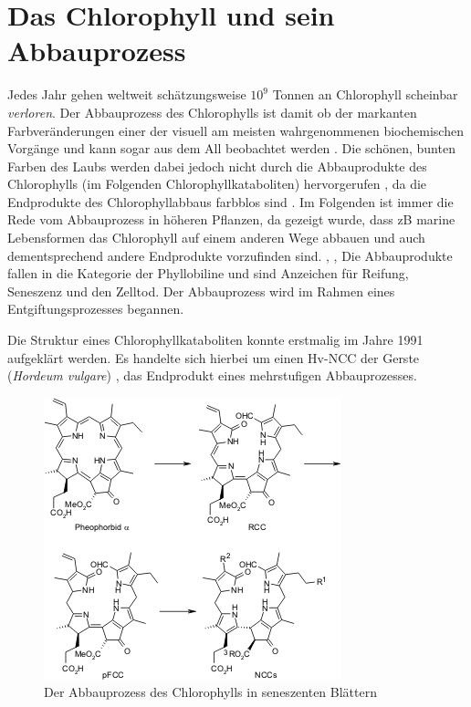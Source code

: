 \chapter{Das Chlorophyll und sein Abbauprozess}

Jedes Jahr gehen weltweit schätzungsweise $10^{9}$ Tonnen an Chlorophyll scheinbar \textit{verloren}. Der Abbauprozess des Chlorophylls ist damit ob der markanten Farbveränderungen einer der visuell am meisten wahrgenommenen biochemischen Vorgänge und kann sogar aus dem All beobachtet werden \cite{ChlorophyllBreakdown}. Die schönen, bunten Farben des Laubs werden dabei jedoch nicht durch die Abbauprodukte des Chlorophylls (im Folgenden Chlorophyllkataboliten) hervorgerufen  \cite{DegradationChlorophyll}, da die Endprodukte des Chlorophyllabbaus farbblos sind \cite{ChlorophyllBreakdown}. Im Folgenden ist immer die Rede vom Abbauprozess in höheren Pflanzen, da gezeigt wurde, dass \gls{zB} marine Lebensformen das Chlorophyll auf einem anderen Wege abbauen und auch dementsprechend andere Endprodukte vorzufinden sind. \cite{ChlorophyllBreakdown}, \cite{ErsterKatabolit}, \cite{ChlorophyllCataboliteDifferent} Die Abbauprodukte fallen in die Kategorie der Phyllobiline und sind Anzeichen für Reifung, Seneszenz und den Zelltod. Der Abbauprozess wird im Rahmen eines Entgiftungsprozesses begannen. \cite{ChlorophyllKatabolitenalsZeichenReifung}

Die Struktur eines Chlorophyllkataboliten konnte erstmalig im Jahre 1991 aufgeklärt werden. Es handelte sich hierbei um einen Hv-\gls{NCC} der Gerste (\textit{Hordeum vulgare}) \cite{ErsterKatabolit}, das Endprodukt eines mehrstufigen Abbauprozesses. 

\begin{figure}[hbtp]
  \centering
  \includegraphics[scale=0.57]{figures/Kapitel2/VWA_Schema_Chlorophyllabbau.png}
  \caption[Abbauprozess des Chlorophylls, Quelle: http://www.organische-chemie.ch/chemie/2007nov/antioxidantien.shtm (Zugegriffen am: 05.11.2017)]{Der Abbauprozess des Chlorophylls in seneszenten Blättern}
  \label{fig:Chlorophyllabbau}
\end{figure}

